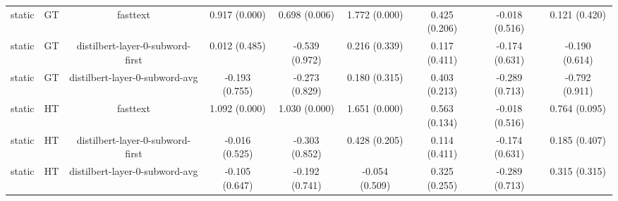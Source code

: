 \begin{sidewaystable}[htb]
\begin{tabular}{@{}ccccccccc@{}}
        static & GT & fasttext & 0.917 (0.000) & 0.698 (0.006) & 1.772 (0.000) & 0.425 (0.206) & -0.018 (0.516) & 0.121 (0.420) \\
        static & GT & distilbert-layer-0-subword-first & 0.012 (0.485) & -0.539 (0.972) & 0.216 (0.339) & 0.117 (0.411) & -0.174 (0.631) & -0.190 (0.614) \\
        static & GT & distilbert-layer-0-subword-avg & -0.193 (0.755) & -0.273 (0.829) & 0.180 (0.315) & 0.403 (0.213) & -0.289 (0.713) & -0.792 (0.911) \\
        static & HT & fasttext & 1.092 (0.000) & 1.030 (0.000) & 1.651 (0.000) & 0.563 (0.134) & -0.018 (0.516) & 0.764 (0.095) \\
        static & HT & distilbert-layer-0-subword-first & -0.016 (0.525) & -0.303 (0.852) & 0.428 (0.205) & 0.114 (0.411) & -0.174 (0.631) & 0.185 (0.407) \\
        static & HT & distilbert-layer-0-subword-avg & -0.105 (0.647) & -0.192 (0.741) & -0.054 (0.509) & 0.325 (0.255) & -0.289 (0.713) & 0.315 (0.315) \\
        \bottomrule
    \end{tabular}
\end{sidewaystable}